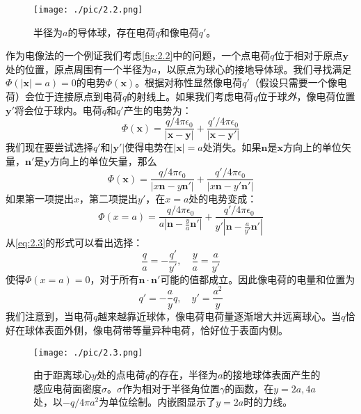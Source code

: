 \documentclass[12pt]{book}
\numberwithin{equation}{chapter}
\numberwithin{figure}{chapter}
\numberwithin{footnote}{page}
\begin{document}
\begin{figure}[!ht]
    \centering
    \texttt{[image: ./pic/2.2.png]}
    \captionsetup{justification=raggedright, singlelinecheck=false}
    \caption{半径为$a$的导体球，存在电荷$q$和像电荷$q'$。}
    \label{fig:2.2}
\end{figure}

作为电像法的一个例证我们考虑\autoref{fig:2.2}中的问题，一个点电荷$q$位于相对于原点$\mathbf{y}$处的位置，原点周围有一个半径为$a$，以原点为球心的接地导体球。我们寻找满足$\Phi(|\mathbf{x}|=a)=0$的电势$\Phi(\mathbf{x})$。根据对称性显然像电荷$q'$（假设只需要一个像电荷）会位于连接原点到电荷$q$的射线上。如果我们考虑电荷$q$位于球\textit{外}，像电荷位置$\mathbf{y'}$将会位于球内。电荷$q$和$q'$产生的电势为：
\begin{equation}\label{eq:2.1}
    \Phi(\mathbf{x})=\frac{q/4\pi\epsilon_0}{|\mathbf{x}-\mathbf{y}|}+\frac{q'/4\pi\epsilon_0}{|\mathbf{x}-\mathbf{y'}|}
\end{equation}
我们现在要尝试选择$q'$和$|\mathbf{y'}|$使得电势在$|\mathbf{x}|=a$处消失。如果$\mathbf{n}$是$\mathbf{x}$方向上的单位矢量，$\mathbf{n'}$是$\mathbf{y
}$方向上的单位矢量，那么
\begin{equation}\label{eq:2.2}
    \Phi(\mathbf{x})=\frac{q/4\pi\epsilon_0}{|x\mathbf{n}-y\mathbf{n'}|}+\frac{q'/4\pi\epsilon_0}{|x\mathbf{n}-y'\mathbf{n'}|}
\end{equation}
如果第一项提出$x$，第二项提出$y'$，在$x=a$处的电势变成：
\begin{equation}\label{eq:2.3}
    \Phi(x=a)=\frac{q/4\pi\epsilon_0}{a|\mathbf{n}-\frac{y}{a}\mathbf{n'}|}+\frac{q'/4\pi\epsilon_0}{y'|\mathbf{n}-\frac{a}{y'}\mathbf{n'}|}
\end{equation}
从\autoref{eq:2.3}的形式可以看出选择：
$$\frac{q}{a}=-\frac{q'}{y'},\quad \frac{y}{a}=\frac{a}{y'}$$
使得$\Phi(x=a)=0$，对于所有$\mathbf{n}\cdot\mathbf{n'}$可能的值都成立。因此像电荷的电量和位置为
\begin{equation}\label{eq:2.4}
    q'=-\frac{a}{y}q, \quad y'=\frac{a^2}{y}
\end{equation}
我们注意到，当电荷$q$越来越靠近球体，像电荷电荷量逐渐增大并远离球心。当$q$恰好在球体表面外侧，像电荷带等量异种电荷，恰好位于表面内侧。

\begin{figure}[!ht]
    \centering
    \texttt{[image: ./pic/2.3.png]}
    \captionsetup{justification=raggedright, singlelinecheck=false}
    \caption{由于距离球心$y$处的点电荷$q$的存在，半径为$a$的接地球体表面产生的感应电荷面密度$\sigma$。$\sigma$作为相对于半径角位置$\gamma$的函数，在$y=2a,4a$处，以$-q/4\pi a^2$为单位绘制。内嵌图显示了$y=2a$时的力线。}
    \label{fig:2.3}
\end{figure}
\end{document}
